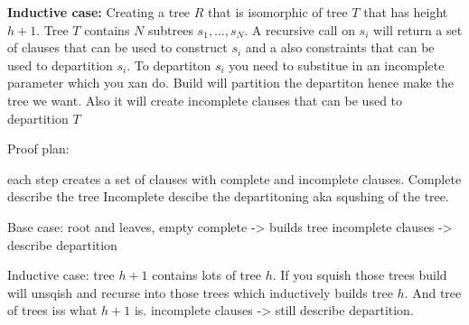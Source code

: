 \textbf{Inductive case:} Creating a tree $R$ that is isomorphic of tree $T$ that has height $h+1$. Tree $T$ contains $N$ subtrees $s_1, \ldots, s_N$. A recursive call on $s_i$ will return a set of clauses that can be used to construct $s_i$ and a also constraints that can be used to departition $s_i$. To departiton $s_i$ you need to substitue in an incomplete parameter which you xan do. Build will partition the departiton hence make the tree we want. Also it will create incomplete clauses that can be used to departition $T$


Proof plan:

each step creates a set of clauses with complete and incomplete clauses.
Complete describe the tree
Incomplete descibe the departitoning aka squshing of the tree.

Base case: root and leaves, 
empty complete -> builds tree
incomplete clauses -> describe departition

Inductive case:
tree $h+1$ contains lots of tree $h$. If you squish those trees build will unsqish and recurse into those trees which inductively builds tree $h$. And tree of trees iss what $h+1$ is.
incomplete clauses -> still describe departition.
